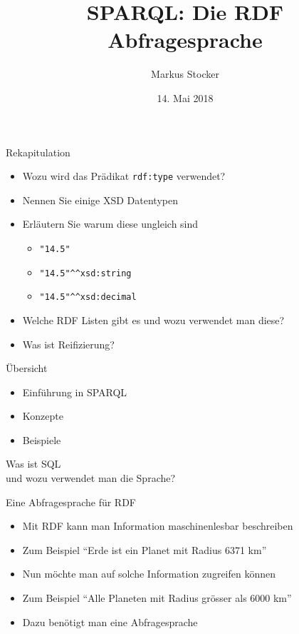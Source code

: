 \documentclass{beamer}
\title{SPARQL: Die RDF Abfragesprache}
\author{Markus Stocker}
\date{14. Mai 2018}
\begin{document}
\maketitle

\begin{frame}{Rekapitulation}
	
	\begin{itemize}
		\item Wozu wird das Prädikat \texttt{rdf:type} verwendet?
		\item Nennen Sie einige XSD Datentypen
		\item Erläutern Sie warum diese ungleich sind
		\begin{itemize}
			\item \texttt{"14.5"}
			\item \texttt{"14.5"\^{}\^{}xsd:string}
			\item \texttt{"14.5"\^{}\^{}xsd:decimal}
		\end{itemize}
		\item Welche RDF Listen gibt es und wozu verwendet man diese?
		\item Was ist Reifizierung?
	\end{itemize}
	
\end{frame}

\begin{frame}{Übersicht}
	
	\begin{itemize}
		\item Einführung in SPARQL
		\item Konzepte
		\item Beispiele
	\end{itemize}
	
\end{frame}

\begin{frame}
	
	\huge
	\begin{center}
		Was ist SQL\\und wozu verwendet man die Sprache?
	\end{center}
	
\end{frame}

\begin{frame}{Eine Abfragesprache für RDF}
	
	\begin{itemize}
		\item Mit RDF kann man Information maschinenlesbar beschreiben
		\item Zum Beispiel ``Erde ist ein Planet mit Radius 6371 km''
		\item Nun möchte man auf solche Information zugreifen können
		\item Zum Beispiel ``Alle Planeten mit Radius grösser als 6000 km''
		\item Dazu benötigt man eine Abfragesprache
	\end{itemize}
	
\end{frame}
\end{document}
